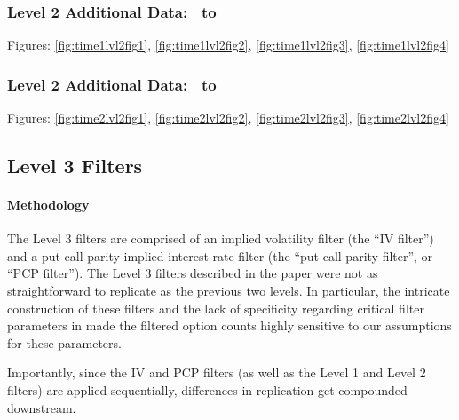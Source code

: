 \clearpage

\subsubsection{Level 2 Additional Data: \STARTONE\ to \ENDONE }
Figures: \autoref{fig:time1lvl2fig1}, \autoref{fig:time1lvl2fig2}, \autoref{fig:time1lvl2fig3}, \autoref{fig:time1lvl2fig4}

\subsubsection{Level 2 Additional Data: \STARTTWO\ to \ENDTWO }
Figures: \autoref{fig:time2lvl2fig1}, \autoref{fig:time2lvl2fig2}, \autoref{fig:time2lvl2fig3}, \autoref{fig:time2lvl2fig4}


\subsection{Level 3 Filters} 

\paragraph{Methodology}
The Level 3 filters are comprised of an implied volatility filter (the ``IV filter'') and a put-call parity implied interest rate filter (the ``put-call parity filter'', or ``PCP filter''). The Level 3 filters described in the paper were not as straightforward to replicate as the previous two levels. In particular, the intricate construction of these filters and the lack of specificity regarding critical filter parameters in \citet{constantinides2013} made the filtered option counts highly sensitive to our assumptions for these parameters. 

Importantly, since the IV and PCP filters (as well as the Level 1 and Level 2 filters) are applied sequentially, differences in replication get compounded downstream.

